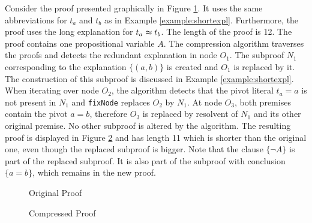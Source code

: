 

\begin{example}

Consider the proof presented graphically in Figure \ref{fig:compressproof}.
It uses the same abbreviations for $t_a$ and $t_b$ as in Example \ref{example:shortexpl}.
Furthermore, the proof uses the long explanation for $t_a \thickapprox t_b$.
The length of the proof is 12.
The proof contains one propositional variable $A$.
The compression algorithm traverses the proofs and detects the redundant explanation in node $O_1$.
The subproof $N_1$ corresponding to the explanation $\{(a,b)\}$ is created and $O_1$ is replaced by it.
The construction of this subproof is discussed in Example \ref{example:shortexpl}.
When iterating over node $O_2$, the algorithm detects that the pivot literal $t_a = a$ is not present in $N_1$ and \texttt{fixNode} replaces $O_2$ by $N_1$.
At node $O_3$, both premises contain the pivot $a = b$, therefore $O_3$ is replaced by resolvent of $N_1$ and its other original premise.
No other subproof is altered by the algorithm.
The resulting proof is displayed in Figure \ref{fig:compressproof_2} and has length 11 which is shorter than the original one, even though the replaced subproof is bigger.
Note that the clause $\{\neg A\}$ is part of the replaced subproof.
It is also part of the subproof with conclusion $\{a = b\}$, which remains in the new proof.

\begin{figure}[!h]

\caption{Original Proof}
\label{fig:compressproof}
\end{figure}

\begin{figure}[!h]

\caption{Compressed Proof}
\label{fig:compressproof_2}
\end{figure}

\end{example}

\FloatBarrier
